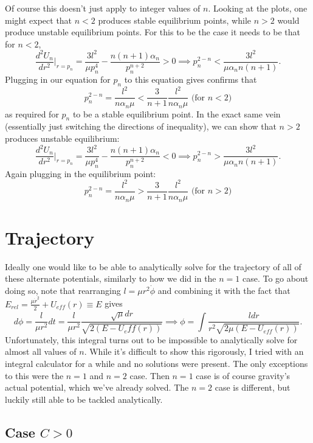 \documentclass[letterpaper, reqno,11pt]{article}
\begin{document}
Of course this doesn't just apply to integer values of  $n$. Looking at the plots, one might expect that $n<2$ produces stable equilibrium points, while $n>2$ would produce unstable equilibrium points. For this to be the case it needs to be that for $n<2$,  
\[
\frac{d^2U_n}{dr^2}\bigg|_{r=p_n}=\frac{3l^2}{\mu p_n^{4}}-\frac{n(n+1)\alpha_n}{p_n^{n+2}}>0\implies p_n^{2-n}<\frac{3l^2}{\mu\alpha_n n (n+1)}
.\]
Plugging in our equation for $p_n$ to this equation gives confirms that 
\[
p_n^{2-n}=\frac{l^2}{n\alpha_n\mu}< \frac{3}{n+1} \frac{l^2}{n\alpha_n\mu}  \text{ (for $n<2$)}
\]
as required for $p_n$ to be a stable equilibrium point. In the exact same vein (essentially just switching the directions of inequality), we can show that $n>2$ produces unstable equilibrium: 
\[
\frac{d^2U_n}{dr^2}\bigg|_{r=p_n}=\frac{3l^2}{\mu p_n^{4}}-\frac{n(n+1)\alpha_n}{p_n^{n+2}}<0\implies p_n^{2-n}>\frac{3l^2}{\mu\alpha_n n (n+1)}
.\]
Again plugging in the equilibrium point: 
\[
p_n^{2-n}=\frac{l^2}{n\alpha_n\mu}> \frac{3}{n+1} \frac{l^2}{n\alpha_n\mu}  \text{ (for $n>2$)}
\]

\section{Trajectory}

Ideally one would like to be able to analytically solve for the trajectory of all of these alternate potentials, similarly to how we did in the $n=1$ case. To go about doing so, note that rearranging $l=\mu r^2\dot\phi$ and combining it with the fact that $E_{rel}=\frac{\mu \dot r^2}{2} +U_{eff}(r)\equiv E$ gives 
\[
d\phi=\frac{l}{\mu r^2}dt=\frac{l}{\mu r^2}\frac{\sqrt{\mu}dr }{\sqrt{ 2(E-U_eff(r))}}\implies\phi=\int \frac{ldr}{r^2\sqrt{2\mu\left( E-U_{eff}(r) \right) } }
.\]
Unfortunately, this integral turns out to be impossible to analytically solve for almost all values of $n$. While it's difficult to show this rigorously, I tried with an integral calculator for a while and no solutions were present. The only exceptions to this were the $n=1$ and $n=2$ case. Then $n=1$ case is of course gravity's actual potential, which we've already solved. The $n=2$ case is different, but luckily still able to be tackled analytically. 

\subsection{Case $C>0$}
\end{document}
